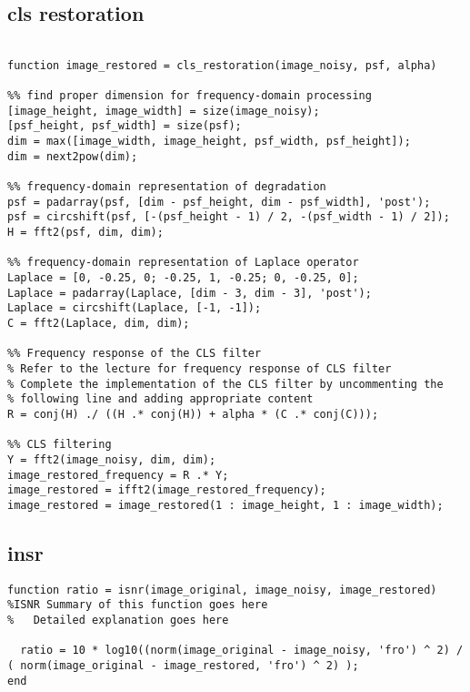 \documentclass[12 pt]{article}
\begin{document}
 \subsection{cls restoration}
 
 \begin{lstlisting}
 
function image_restored = cls_restoration(image_noisy, psf, alpha)

%% find proper dimension for frequency-domain processing
[image_height, image_width] = size(image_noisy);
[psf_height, psf_width] = size(psf);
dim = max([image_width, image_height, psf_width, psf_height]);
dim = next2pow(dim);

%% frequency-domain representation of degradation
psf = padarray(psf, [dim - psf_height, dim - psf_width], 'post');
psf = circshift(psf, [-(psf_height - 1) / 2, -(psf_width - 1) / 2]);
H = fft2(psf, dim, dim);

%% frequency-domain representation of Laplace operator
Laplace = [0, -0.25, 0; -0.25, 1, -0.25; 0, -0.25, 0];
Laplace = padarray(Laplace, [dim - 3, dim - 3], 'post');
Laplace = circshift(Laplace, [-1, -1]);
C = fft2(Laplace, dim, dim);

%% Frequency response of the CLS filter
% Refer to the lecture for frequency response of CLS filter
% Complete the implementation of the CLS filter by uncommenting the
% following line and adding appropriate content
R = conj(H) ./ ((H .* conj(H)) + alpha * (C .* conj(C)));

%% CLS filtering
Y = fft2(image_noisy, dim, dim);
image_restored_frequency = R .* Y;
image_restored = ifft2(image_restored_frequency);
image_restored = image_restored(1 : image_height, 1 : image_width);

 \end{lstlisting}
 
 
 
 
\subsection{insr}

 \begin{lstlisting}
function ratio = isnr(image_original, image_noisy, image_restored)
%ISNR Summary of this function goes here
%   Detailed explanation goes here

  ratio = 10 * log10((norm(image_original - image_noisy, 'fro') ^ 2) / ( norm(image_original - image_restored, 'fro') ^ 2) );
end

 \end{lstlisting}
\end{document}
